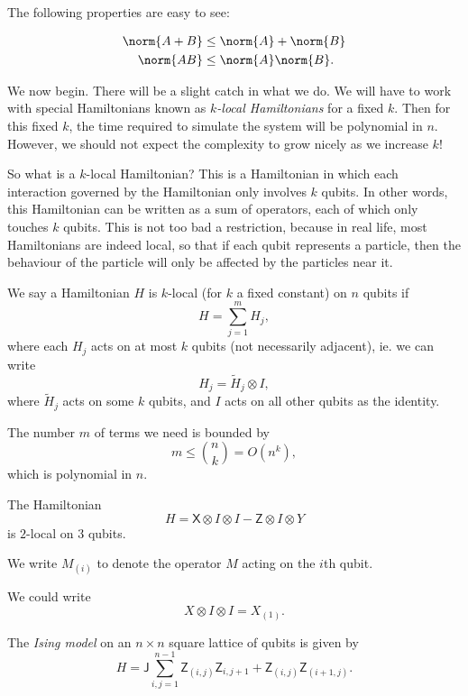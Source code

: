 \documentclass[a4paper]{article}
\newcommand{\qJ}{\mathsf{J}}
\newcommand{\qX}{\mathsf{X}}
\newcommand{\qZ}{\mathsf{Z}}
\begin{document}
The following properties are easy to see:
\begin{prop}
  \begin{align*}
    \norm{A + B} &\leq \norm{A} + \norm{B}\\
    \norm{AB} &\leq \norm{A}\norm{B}.
  \end{align*}
\end{prop}

We now begin. There will be a slight catch in what we do. We will have to work with special Hamiltonians known as \emph{$k$-local Hamiltonians} for a fixed $k$. Then for this fixed $k$, the time required to simulate the system will be polynomial in $n$. However, we should not expect the complexity to grow nicely as we increase $k$!

So what is a $k$-local Hamiltonian? This is a Hamiltonian in which each interaction governed by the Hamiltonian only involves $k$ qubits. In other words, this Hamiltonian can be written as a sum of operators, each of which only touches $k$ qubits. This is not too bad a restriction, because in real life, most Hamiltonians are indeed local, so that if each qubit represents a particle, then the behaviour of the particle will only be affected by the particles near it.

\begin{defi}
  We say a Hamiltonian $H$ is $k$-local (for $k$ a fixed constant) on $n$ qubits if
  \[
    H = \sum_{j = 1}^m H_j,
  \]
  where each $H_j$ acts on at most $k$ qubits (not necessarily adjacent), ie. we can write
  \[
    H_j = \tilde{H}_j \otimes I,
  \]
  where $\tilde{H}_j$ acts on some $k$ qubits, and $I$ acts on all other qubits as the identity.
\end{defi}

The number $m$ of terms we need is bounded by
\[
  m \leq \binom{n}{k} = O(n^k),
\]
which is polynomial in $n$.

\begin{eg}
  The Hamiltonian
  \[
    H = \qX \otimes I \otimes I - \qZ \otimes I \otimes Y
  \]
  is $2$-local on $3$ qubits.
\end{eg}

We write $M_{(i)}$ to denote the operator $M$ acting on the $i$th qubit.
\begin{eg}
  We could write
  \[
    X \otimes I \otimes I = X_{(1)}.
  \]
\end{eg}

\begin{eg}
  The \emph{Ising model} on an $n \times n$ square lattice of qubits is given by
  \[
    H = \qJ \sum_{i, j = 1}^{n - 1} \qZ_{(i, j)} \qZ_{i, j + 1} + \qZ_{(i, j)} \qZ_{(i + 1, j)}.
  \]
\end{eg}
\end{document}
